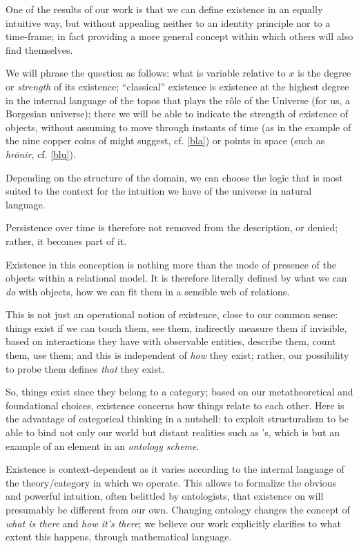 One of the results of our work is that we can define existence in an equally intuitive way, but without appealing neither to an identity principle nor to a time-frame; in fact providing a more general concept within which others will also find themselves.

We will phrase the question as follows: what is variable relative to $x$ is the degree or \emph{strength} of its existence; ``classical'' existence is existence at the highest degree in the internal language of the topos that plays the r\^ole of the Universe (for us, a Borgesian universe); there we will be able to indicate the strength of existence of objects, without assuming to move through instants of time (as in the example of the nine copper coins of \cite{tlonEN} might suggest, cf. \autoref{bla}) or points in space (such as \emph{hr\"onir}, cf. \autoref{blu}).

Depending on the structure of the domain, we can choose the logic that is most suited to the context for the intuition we have of the universe in natural language.

Persistence over time is therefore not removed from the description, or denied; rather, it becomes part of it.

Existence in this conception is nothing more than the mode of presence of the objects within a relational model. It is therefore literally defined by what we can \emph{do} with objects, how we can fit them in a sensible web of relations.

This is not just an operational notion of existence, close to our common sense: things exist if we can touch them, see them, indirectly measure them if invisible, based on interactions they have with observable entities, describe them, count them, use them; and this is independent of \emph{how} they exist; rather, our possibility to probe them defines \emph{that} they exist.

So, things exist since they belong to a category; based on our metatheoretical and foundational choices, existence concerns how things relate to each other. Here is the advantage of categorical thinking in a nutshell: to exploit structuralism to be able to bind not only our world but distant realities such as \tlon's, which is but an example of an element in an \emph{ontology scheme}.

Existence is context-dependent as it varies according to the internal language of the theory/category in which we operate. This allows to formalize the obvious and powerful intuition, often belittled by ontologists, that existence on \tlon will presumably be different from our own. Changing ontology changes the concept of \emph{what is there} and \emph{how it's there}; we believe our work explicitly clarifies to what extent this happens, through mathematical language.
